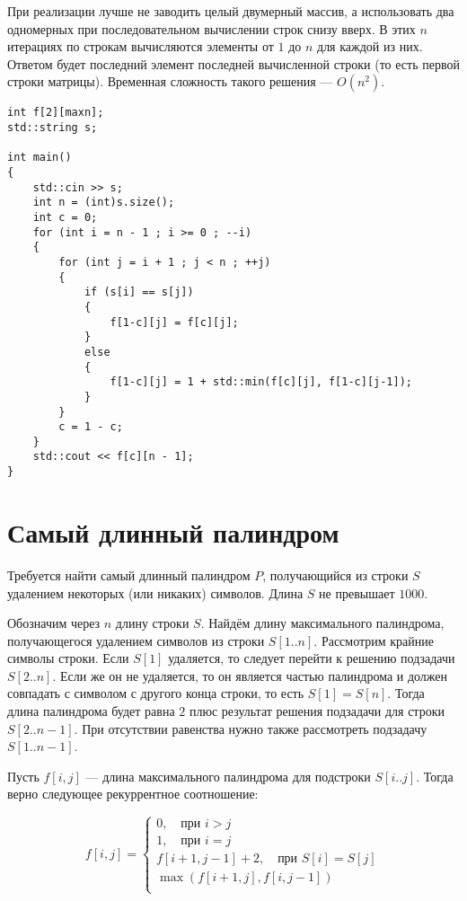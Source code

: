 \documentclass[14pt,openany]{book}
\begin{document}
При реализации лучше не заводить целый двумерный массив, а использовать два
одномерных при последовательном вычислении строк снизу вверх.
В этих $n$ итерациях по строкам вычисляются элементы от $1$ до $n$ для каждой из них.
Ответом будет последний элемент последней вычисленной строки (то есть первой строки
матрицы). Временная сложность такого решения --- $O(n^2)$.

\begin{lstlisting}
int f[2][maxn];
std::string s;

int main()
{
    std::cin >> s;
    int n = (int)s.size();
    int c = 0;
    for (int i = n - 1 ; i >= 0 ; --i)
    {
        for (int j = i + 1 ; j < n ; ++j)
        {
            if (s[i] == s[j])
            {
                f[1-c][j] = f[c][j];
            }
            else
            {
                f[1-c][j] = 1 + std::min(f[c][j], f[1-c][j-1]);
            }
        }
        c = 1 - c;
    }
    std::cout << f[c][n - 1];
}
\end{lstlisting}

\section{Самый длинный палиндром}

Требуется найти самый длинный палиндром $P$, получающийся из строки $S$ удалением некоторых
(или никаких) символов. Длина $S$ не превышает $1000$.

Обозначим через $n$ длину строки $S$. Найдём длину максимального палиндрома, получающегося
удалением символов из строки $S[1..n]$. Рассмотрим крайние символы строки.
Если $S[1]$ удаляется, то следует перейти к решению подзадачи $S[2..n]$. Если же он
не удаляется, то он является частью палиндрома и должен совпадать с символом с другого конца
строки, то есть $S[1] = S[n]$. Тогда длина палиндрома будет равна $2$ плюс результат
решения подзадачи для строки $S[2..n-1]$. При отсутствии равенства нужно также рассмотреть
подзадачу $S[1..n-1]$.

Пусть $f[i,j]$ --- длина максимального палиндрома для подстроки $S[i..j]$. Тогда верно
следующее рекуррентное соотношение:

$$
  f[i,j] = \left\{\begin{array}{l}
      0, \quad \text{при $i > j$} \\
      1, \quad \text{при $i = j$} \\
      f[i+1, j-1] + 2, \quad \text{при $S[i] = S[j]$} \\
      \max(f[i+1, j], f[i, j-1]) \\
  \end{array}\right.
$$
\end{document}
